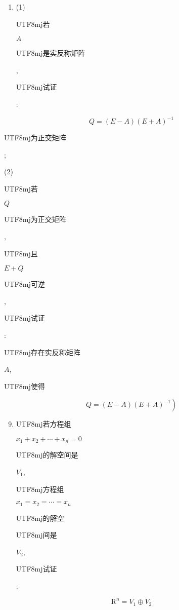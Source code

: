 \documentclass[10pt]{article}
\begin{document}
\begin{enumerate}
  \item (1) \begin{CJK}{UTF8}{mj}若\end{CJK} $A$ \begin{CJK}{UTF8}{mj}是实反称矩阵\end{CJK}, \begin{CJK}{UTF8}{mj}试证\end{CJK}:

\end{enumerate}
$$
Q=(E-A)(E+A)^{-1}
$$
\begin{CJK}{UTF8}{mj}为正交矩阵\end{CJK};

(2) \begin{CJK}{UTF8}{mj}若\end{CJK} $Q$ \begin{CJK}{UTF8}{mj}为正交矩阵\end{CJK}, \begin{CJK}{UTF8}{mj}且\end{CJK} $E+Q$ \begin{CJK}{UTF8}{mj}可逆\end{CJK}, \begin{CJK}{UTF8}{mj}试证\end{CJK}: \begin{CJK}{UTF8}{mj}存在实反称矩阵\end{CJK} $A$, \begin{CJK}{UTF8}{mj}使得\end{CJK}
$$
\left.Q=(E-A)(E+A)^{-1}\right)
$$

\begin{enumerate}
  \setcounter{enumi}{8}
  \item \begin{CJK}{UTF8}{mj}若方程组\end{CJK} $x_{1}+x_{2}+\cdots+x_{n}=0$ \begin{CJK}{UTF8}{mj}的解空间是\end{CJK} $V_{1}$, \begin{CJK}{UTF8}{mj}方程组\end{CJK} $x_{1}=x_{2}=\cdots=x_{n}$ \begin{CJK}{UTF8}{mj}的解空\end{CJK} \begin{CJK}{UTF8}{mj}间是\end{CJK} $V_{2}$, \begin{CJK}{UTF8}{mj}试证\end{CJK}:
\end{enumerate}
$$
\mathrm{R}^{n}=V_{1} \oplus V_{2}
$$
\end{document}
